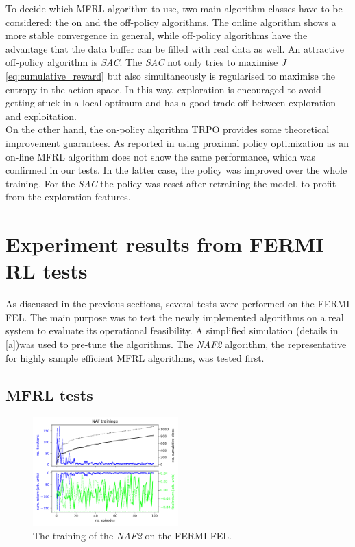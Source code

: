 \documentclass[
reprint,
amsmath,amssymb,amsfonts,clevref,
aps,
prstab,
]{revtex4-2}
\begin{document}
	To decide which MFRL algorithm to use, two main algorithm classes have to be considered: the on and the off-policy algorithms. The online algorithm shows a more stable convergence in general, while off-policy algorithms have the advantage that the data buffer can be filled with real data as well. An attractive off-policy algorithm is \emph{SAC}. The \emph{SAC} not only tries to maximise $J$ \cref{eq:cumulative_reward} but also simultaneously is regularised to maximise the entropy in the action space. In this way, exploration is encouraged to avoid getting stuck in a local optimum and has a good trade-off between exploration and exploitation.\\
	 On the other hand, the on-policy algorithm TRPO provides some theoretical improvement guarantees. As reported in \cite{Kurutach2018} using proximal policy optimization \cite{Schulman2017} as an on-line MFRL algorithm does not show the same performance, which was confirmed in our tests. In the latter case, the policy was improved over the whole training. For the \emph{SAC} the policy was reset after retraining the model, to profit from the exploration features.
	\section{Experiment results from FERMI RL tests}
	As discussed in the previous sections, several tests were performed on the FERMI FEL.
	The main purpose was to test the newly implemented algorithms on a real system to evaluate its operational feasibility. A simplified simulation (details in \cref{a})was used to pre-tune the algorithms. The \emph{NAF2} algorithm, the representative for highly sample efficient MFRL algorithms, was tested first.
	\subsection{MFRL tests}
		\begin{figure}[!h]
		\centering
		\includegraphics*[width=0.5\textwidth]{Figures/FERMI_all_experiments_NAF_training_episodes.pdf}
		\caption{The training of the \emph{NAF2} on the FERMI FEL.}
		\label{fig:NAF_training}
	\end{figure}
	
\end{document}
